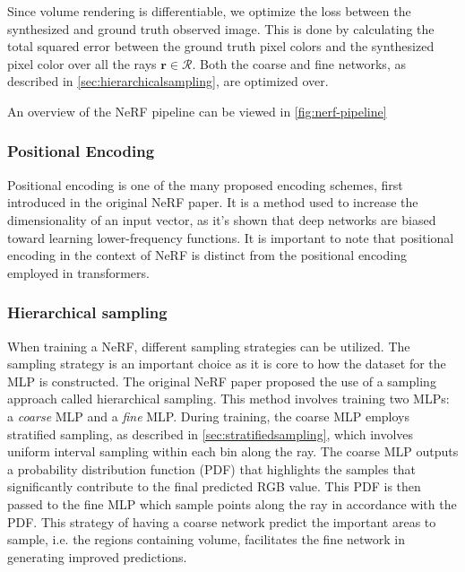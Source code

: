 Since volume rendering is differentiable, we optimize the loss between the synthesized and ground truth observed image. This is done by calculating the total squared error between the ground truth pixel colors and the synthesized pixel color over all the rays $\pmb{r} \in \mathcal{R}$. Both the coarse and fine networks, as described in \autoref{sec:hierarchicalsampling}, are optimized over.



An overview of the NeRF pipeline can be viewed in \autoref{fig:nerf-pipeline}



\subsubsection{Positional Encoding} \label{sec:positionalencoding}
Positional encoding is one of the many proposed encoding schemes, first introduced in the original NeRF paper. It is a method used to increase the dimensionality of an input vector, as it's shown that deep networks are biased toward learning lower-frequency functions. It is important to note that positional encoding in the context of NeRF is distinct from the positional encoding employed in transformers.

\subsubsection{Hierarchical sampling} \label{sec:hierarchicalsampling}
When training a NeRF, different sampling strategies can be utilized. The sampling strategy is an important choice as it is core to how the dataset for the MLP is constructed. The original NeRF paper proposed the use of a sampling approach called hierarchical sampling. This method involves training two MLPs: a \textit{coarse} MLP and a \textit{fine} MLP. During training, the coarse MLP employs stratified sampling, as described in \autoref{sec:stratifiedsampling}, which involves uniform interval sampling within each bin along the ray. The coarse MLP outputs a probability distribution function (PDF) that highlights the samples that significantly contribute to the final predicted RGB value. This PDF is then passed to the fine MLP which sample points along the ray in accordance with the PDF. This strategy of having a coarse network predict the important areas to sample, i.e. the regions containing volume, facilitates the fine network in generating improved predictions.

